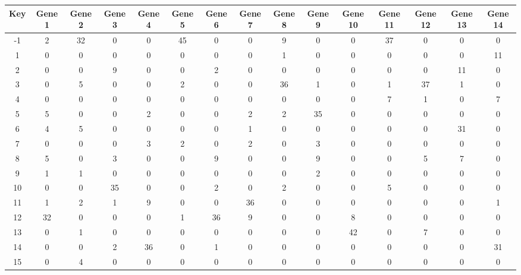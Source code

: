 \begin{tabular}{|c|c|c|c|c|c|c|c|c|c|c|c|c|c|c|}
\hline
Key & Gene 1 & Gene 2 & Gene 3 & Gene 4 & Gene 5 & Gene 6 & Gene 7 & Gene 8 & Gene 9 & Gene 10 & Gene 11 & Gene 12 & Gene 13 & Gene 14 \\
\hline
-1 & 2 & 32 & 0 & 0 & 45 & 0 & 0 & 9 & 0 & 0 & 37 & 0 & 0 & 0 \\
1 & 0 & 0 & 0 & 0 & 0 & 0 & 0 & 1 & 0 & 0 & 0 & 0 & 0 & 11 \\
2 & 0 & 0 & 9 & 0 & 0 & 2 & 0 & 0 & 0 & 0 & 0 & 0 & 11 & 0 \\
3 & 0 & 5 & 0 & 0 & 2 & 0 & 0 & 36 & 1 & 0 & 1 & 37 & 1 & 0 \\
4 & 0 & 0 & 0 & 0 & 0 & 0 & 0 & 0 & 0 & 0 & 7 & 1 & 0 & 7 \\
5 & 5 & 0 & 0 & 2 & 0 & 0 & 2 & 2 & 35 & 0 & 0 & 0 & 0 & 0 \\
6 & 4 & 5 & 0 & 0 & 0 & 0 & 1 & 0 & 0 & 0 & 0 & 0 & 31 & 0 \\
7 & 0 & 0 & 0 & 3 & 2 & 0 & 2 & 0 & 3 & 0 & 0 & 0 & 0 & 0 \\
8 & 5 & 0 & 3 & 0 & 0 & 9 & 0 & 0 & 9 & 0 & 0 & 5 & 7 & 0 \\
9 & 1 & 1 & 0 & 0 & 0 & 0 & 0 & 0 & 2 & 0 & 0 & 0 & 0 & 0 \\
10 & 0 & 0 & 35 & 0 & 0 & 2 & 0 & 2 & 0 & 0 & 5 & 0 & 0 & 0 \\
11 & 1 & 2 & 1 & 9 & 0 & 0 & 36 & 0 & 0 & 0 & 0 & 0 & 0 & 1 \\
12 & 32 & 0 & 0 & 0 & 1 & 36 & 9 & 0 & 0 & 8 & 0 & 0 & 0 & 0 \\
13 & 0 & 1 & 0 & 0 & 0 & 0 & 0 & 0 & 0 & 42 & 0 & 7 & 0 & 0 \\
14 & 0 & 0 & 2 & 36 & 0 & 1 & 0 & 0 & 0 & 0 & 0 & 0 & 0 & 31 \\
15 & 0 & 4 & 0 & 0 & 0 & 0 & 0 & 0 & 0 & 0 & 0 & 0 & 0 & 0 \\
\hline
\end{tabular}